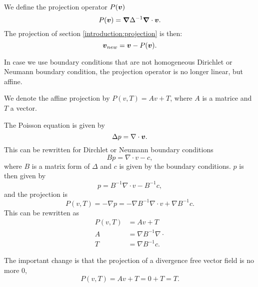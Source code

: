 \begin{definition}
\label{introduction:projectiondef}
We define the projection operator $P({\boldsymbol {v}})$
  \begin{equation}
    P({\boldsymbol {v}})={\boldsymbol {\nabla}}\Delta^{-1}{\boldsymbol {\nabla}}\cdot {\boldsymbol {v}}.
  \end{equation}
  The projection of section \ref{introduction:projection} is then:
  \begin{equation}
    {\boldsymbol {v}}_{new}={\boldsymbol {v}}-P({\boldsymbol {v}}).
  \end{equation}
\end{definition}
  In case we use boundary conditions that are not homogeneous Dirichlet or Neumann boundary condition,
  the projection operator is no longer linear, but affine.

  \begin{definition}
  We denote the affine projection by $P(v,T)=Av+T$, where $A$ is a matrice and $T$ a vector.
  
  The Poisson equation is given by
  \begin{equation}
   \Delta p=\nabla \cdot {\boldsymbol {v}}.
  \end{equation}
This can be rewritten for Dirchlet or Neumann boundary conditions
\begin{equation}
 B p=\nabla \cdot v-c,
\end{equation}
where $B$ is a matrix form of $\Delta$ and $c$ is given by the boundary conditions.
$p$ is then given by
\begin{equation}
 p=B^{-1} \nabla \cdot v-B^{-1}c,
\end{equation}
and the projection is
\begin{equation}
 P(v,T)=-\nabla p=-\nabla B^{-1}\nabla \cdot v+\nabla B^{-1}c.
\end{equation}
This can be rewritten as
\begin{align}
P(v,T)&=Av+T\\
A&=\nabla B^{-1}\nabla \cdot\\
T&=\nabla B^{-1}c.
\end{align}
  
  \end{definition}
  
  The important change is that the projection of a divergence free vector field is no more 0,
  \begin{equation}
  P(v,T)=Av+T=0+T=T.
  \end{equation}



